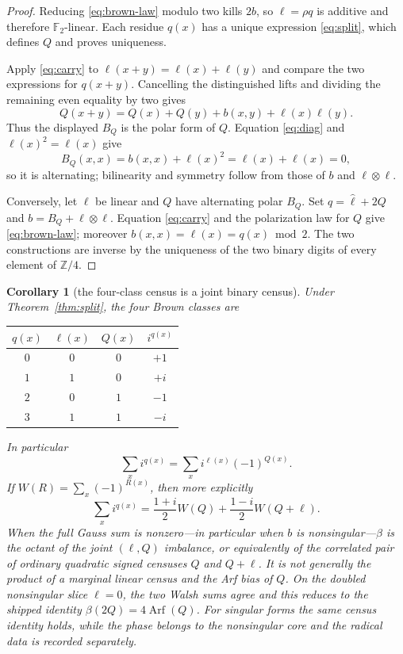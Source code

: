 \documentclass[11pt]{article}
\newtheorem{corollary}[theorem]{Corollary}
\theoremstyle{definition}
\theoremstyle{remark}
\newcommand{\Z}{\mathbb Z}
\newcommand{\F}{\mathbb F}
\newcommand{\Arf}{\operatorname{Arf}}
\begin{document}
\begin{proof}
Reducing \eqref{eq:brown-law} modulo two kills $2b$, so
$\ell=\rho q$ is additive and therefore $\F_2$-linear.  Each residue
$q(x)$ has a unique expression \eqref{eq:split}, which defines $Q$ and proves
uniqueness.

Apply \eqref{eq:carry} to $\ell(x+y)=\ell(x)+\ell(y)$ and compare the two
expressions for $q(x+y)$.  Cancelling the distinguished lifts and dividing
the remaining even equality by two gives
\[
 Q(x+y)=Q(x)+Q(y)+b(x,y)+\ell(x)\ell(y).
\]
Thus the displayed $B_Q$ is the polar form of $Q$.  Equation
\eqref{eq:diag} and $\ell(x)^2=\ell(x)$ give
\[
 B_Q(x,x)=b(x,x)+\ell(x)^2=\ell(x)+\ell(x)=0,
\]
so it is alternating; bilinearity and symmetry follow from those of $b$ and
$\ell\otimes\ell$.

Conversely, let $\ell$ be linear and $Q$ have alternating polar $B_Q$.
Set $q=\widehat\ell+2Q$ and $b=B_Q+\ell\otimes\ell$.  Equation
\eqref{eq:carry} and the polarization law for $Q$ give
\eqref{eq:brown-law}; moreover $b(x,x)=\ell(x)=q(x)\bmod2$.
The two constructions are inverse by the uniqueness of the two binary digits
of every element of $\Z/4$.
\end{proof}

\begin{corollary}[the four-class census is a joint binary census]
\label{cor:census}
Under Theorem~\ref{thm:split}, the four Brown classes are
\begin{center}
\begin{tabular}{cccc}
\toprule
$q(x)$ & $\ell(x)$ & $Q(x)$ & $i^{q(x)}$\\
\midrule
$0$ & $0$ & $0$ & $+1$\\
$1$ & $1$ & $0$ & $+i$\\
$2$ & $0$ & $1$ & $-1$\\
$3$ & $1$ & $1$ & $-i$\\
\bottomrule
\end{tabular}
\end{center}
In particular
\begin{equation}\label{eq:joint-gauss}
 \sum_x i^{q(x)}=\sum_x i^{\ell(x)}(-1)^{Q(x)}.
\end{equation}
If $W(R)=\sum_x(-1)^{R(x)}$, then more explicitly
\begin{equation}\label{eq:walsh-pair}
 \sum_x i^{q(x)}
 =\frac{1+i}{2}W(Q)+\frac{1-i}{2}W(Q+\ell).
\end{equation}
When the full Gauss sum is nonzero---in particular when $b$ is
nonsingular---$\beta$ is the octant of the \emph{joint} $(\ell,Q)$
imbalance, or equivalently of the correlated pair of ordinary quadratic
signed censuses $Q$ and $Q+\ell$.  It is not generally the product of a
marginal linear census and the Arf bias of $Q$.  On the doubled nonsingular
slice $\ell=0$, the two Walsh sums agree and this reduces to the shipped
identity $\beta(2Q)=4\Arf(Q)$.  For singular forms the same census identity
holds, while the phase belongs to the nonsingular core and the radical data
is recorded separately.
\end{corollary}
\end{document}
